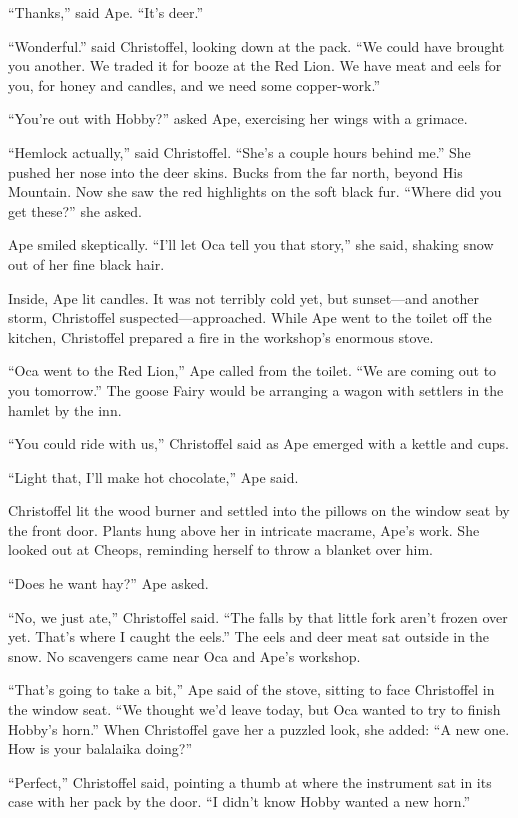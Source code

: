 \documentclass[11pt,a5paper]{article}
\begin{document}
``Thanks,'' said Ape. ``It's deer.''

``Wonderful.'' said Christoffel, looking down at the pack. ``We could have brought you another. We traded it for booze at the Red Lion. We have meat and eels for you, for honey and candles, and we need some copper-work.''

``You're out with Hobby?'' asked Ape, exercising her wings with a grimace.

``Hemlock actually,'' said Christoffel. ``She's a couple hours behind me.'' She pushed her nose into the deer skins. Bucks from the far north, beyond His Mountain. Now she saw the red highlights on the soft black fur. ``Where did you get these?'' she asked.

Ape smiled skeptically. ``I'll let Oca tell you that story,'' she said, shaking snow out of her fine black hair.

Inside, Ape lit candles. It was not terribly cold yet, but sunset---and another storm, Christoffel suspected---approached. While Ape went to the toilet off the kitchen, Christoffel prepared a fire in the workshop's enormous stove.

``Oca went to the Red Lion,'' Ape called from the toilet. ``We are coming out to you tomorrow.'' The goose Fairy would be arranging a wagon with settlers in the hamlet by the inn.

``You could ride with us,'' Christoffel said as Ape emerged with a kettle and cups.

``Light that, I'll make hot chocolate,'' Ape said.

Christoffel lit the wood burner and settled into the pillows on the window seat by the front door. Plants hung above her in intricate macrame, Ape's work. She looked out at Cheops, reminding herself to throw a blanket over him.

``Does he want hay?'' Ape asked.

``No, we just ate,'' Christoffel said. ``The falls by that little fork aren't frozen over yet. That's where I caught the eels.'' The eels and deer meat sat outside in the snow. No scavengers came near Oca and Ape's workshop.

``That's going to take a bit,'' Ape said of the stove, sitting to face Christoffel in the window seat. ``We thought we'd leave today, but Oca wanted to try to finish Hobby's horn.'' When Christoffel gave her a puzzled look, she added: ``A new one. How is your balalaika doing?''

``Perfect,'' Christoffel said, pointing a thumb at where the instrument sat in its case with her pack by the door. ``I didn't know Hobby wanted a new horn.''
\end{document}
